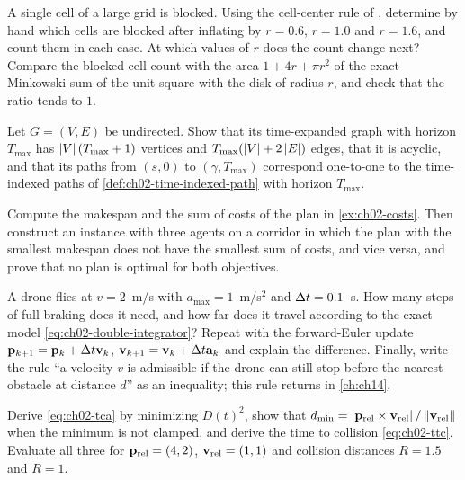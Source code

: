 \begin{exercise}[\difficulty{2}]
\label{exr:ch02-inflation}
A single cell of a large grid is blocked. Using the cell-center rule of , determine by hand which cells are blocked after inflating by $r=0.6$, $r=1.0$ and $r=1.6$, and count them in each case. At which values of $r$ does the count change next? Compare the blocked-cell count with the area $1+4r+\pi r^2$ of the exact Minkowski sum of the unit square with the disk of radius $r$, and check that the ratio tends to $1$.
\end{exercise}

\begin{exercise}[\difficulty{3}]
\label{exr:ch02-time-expanded}
Let $G=(V,E)$ be undirected. Show that its time-expanded graph with horizon $T_{\max}$ has $\left\lvert V \right\rvert(T_{\max}+1)$ vertices and $T_{\max}(\left\lvert V \right\rvert+2\left\lvert E \right\rvert)$ edges, that it is acyclic, and that its paths from $(s,0)$ to $(\gamma,T_{\max})$ correspond one-to-one to the time-indexed paths of \cref{def:ch02-time-indexed-path} with horizon $T_{\max}$.
\end{exercise}

\begin{exercise}[\difficulty{3}]
\label{exr:ch02-costs}
Compute the makespan and the sum of costs of the plan in \cref{ex:ch02-costs}. Then construct an instance with three agents on a corridor in which the plan with the smallest makespan does not have the smallest sum of costs, and vice versa, and prove that no plan is optimal for both objectives.
\end{exercise}

\begin{exercise}[\difficulty{2}]
\label{exr:ch02-stopping}
A drone flies at $v=2$~m/s with $a_{\max}=1$~m/s$^2$ and $\Delta t=0.1$~s. How many steps of full braking does it need, and how far does it travel according to the exact model \cref{eq:ch02-double-integrator}? Repeat with the forward-Euler update $\mathbf{p}_{k+1}=\mathbf{p}_k+\Delta t\mathbf{v}_k$, $\mathbf{v}_{k+1}=\mathbf{v}_k+\Delta t\mathbf{a}_k$ and explain the difference. Finally, write the rule ``a velocity $v$ is admissible if the drone can still stop before the nearest obstacle at distance $d$'' as an inequality; this rule returns in \cref{ch:ch14}.
\end{exercise}

\begin{exercise}[\difficulty{2}]
\label{exr:ch02-closest-approach}
Derive \cref{eq:ch02-tca} by minimizing $D(t)^2$, show that $d_{\min}=\left\lvert \mathbf{p}_{\mathrm{rel}}\times\mathbf{v}_{\mathrm{rel}} \right\rvert/\left\lVert \mathbf{v}_{\mathrm{rel}} \right\rVert$ when the minimum is not clamped, and derive the time to collision \cref{eq:ch02-ttc}. Evaluate all three for $\mathbf{p}_{\mathrm{rel}}=(4,2)$, $\mathbf{v}_{\mathrm{rel}}=(1,1)$ and collision distances $R=1.5$ and $R=1$.
\end{exercise}

